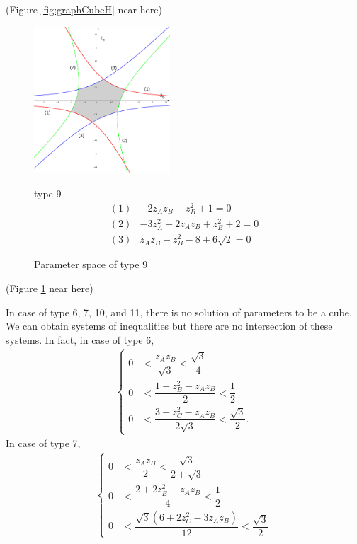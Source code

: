 \documentclass[suppldata, dvipdfmx]{interact}
\theoremstyle{plain}%
\theoremstyle{definition}
\theoremstyle{remark}
\theoremstyle{problemstyle}
\begin{document}
\noindent(Figure \ref{fig:graphCubeH} near here)

\begin{figure}[h!tbp]
 \begin{minipage}[]{0.5\textwidth}
 \centering
 \includegraphics[width=2in,
 keepaspectratio]{./img/graph/cubeI.jpg}
 \caption{Parameter space of type 9}
 \label{fig:graphCubeI}
 \end{minipage}
 \hspace*{\fill}
 \begin{minipage}[]{0.5\textwidth}
  \centering
  type 9
  \begin{align*}
   (1)& -2z_Az_B - z_B^2 + 1 = 0\\
   (2)& -3z_A^2 + 2 z_A z_B + z_B^2 + 2 = 0\\
   (3)& z_Az_B - z_B^2 - 8 + 6\sqrt{2} = 0
  \end{align*}
 \end{minipage}
 \hspace*{\fill}
\end{figure}

\noindent(Figure \ref{fig:graphCubeI} near here)


In case of type 6, 7, 10, and 11, there is no solution of parameters to be a cube.  We can obtain systems of inequalities but there are no intersection of these systems.  In fact, in case of type 6,
\begin{align*}
\begin{cases}
 0 &< \dfrac{z_Az_B}{\sqrt{3}} < \dfrac{\sqrt{3}}{4} \\
 0 &< \dfrac{1 + z^2_B - z_Az_B}{2} < \dfrac{1}{2} \\
 0 &< \dfrac{3 + z^2_C - z_Az_B}{2\sqrt{3}} < \dfrac{\sqrt{3}}{2}.
\end{cases}
\end{align*}
In case of type 7,
\begin{align*}
\begin{cases}
0 &< \dfrac{z_Az_B}{2} < \dfrac{\sqrt{3}}{2 + \sqrt{3}} \\
0 &< \dfrac{2 + 2z^2_B - z_Az_B}{4} < \dfrac{1}{2} \\
0 &< \dfrac{\sqrt{3}(6 + 2z^2_C - 3z_Az_B)}{12} < \dfrac{\sqrt{3}}{2}
\end{cases}
\end{align*}
\end{document}
